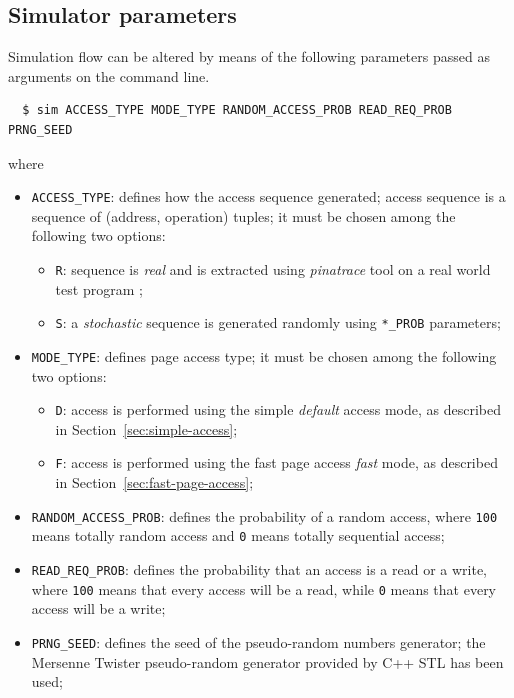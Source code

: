 \documentclass[a4paper,12pt]{article}
\begin{document}
\subsection{Simulator parameters}
Simulation flow can be altered by means of the following parameters passed as arguments on the command line.

\begin{verbatim}
  $ sim ACCESS_TYPE MODE_TYPE RANDOM_ACCESS_PROB READ_REQ_PROB PRNG_SEED
\end{verbatim}

where

\begin{itemize}
  \item \texttt{ACCESS\_TYPE}: defines how the access sequence generated; access sequence is a sequence of (address, operation) tuples; it must be chosen among the following two options:
  \begin{itemize}
    \item \texttt{R}: sequence is \emph{real} and is extracted using \emph{pinatrace} tool on a real world test program \cite{bib:tracing-team};
    \item \texttt{S}: a \emph{stochastic} sequence is generated randomly using \texttt{*\_PROB} parameters;
  \end{itemize}
  \item \texttt{MODE\_TYPE}: defines page access type; it must be chosen among the following two options:
\begin{itemize}
  \item \texttt{D}: access is performed using the simple \emph{default} access mode, as described in Section~\ref{sec:simple-access};
  \item \texttt{F}: access is performed using the fast page access \emph{fast} mode, as described in Section~\ref{sec:fast-page-access};
\end{itemize}
  \item \texttt{RANDOM\_ACCESS\_PROB}: defines the probability of a random access, where \texttt{100} means totally random access and \texttt{0} means totally sequential access;
  \item \texttt{READ\_REQ\_PROB}: defines the probability that an access is a read or a write, where \texttt{100} means that every access will be a read, while \texttt{0} means that every access will be a write;
  \item \texttt{PRNG\_SEED}: defines the seed of the pseudo-random numbers generator; the Mersenne Twister pseudo-random generator provided by C++ STL has been used;
\end{itemize}
\end{document}
